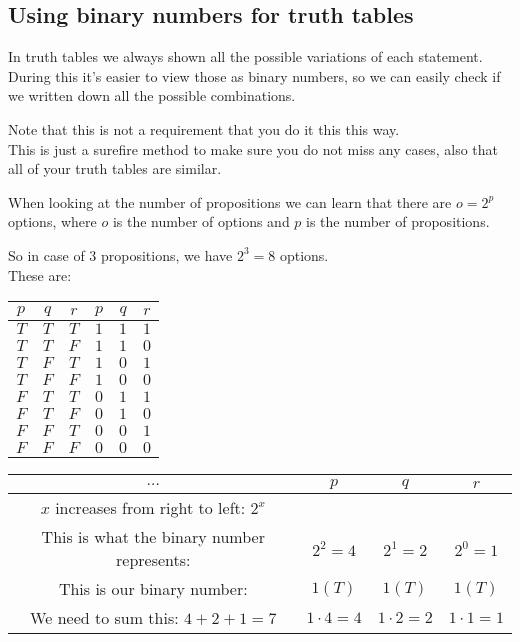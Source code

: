 \documentclass{article}
\begin{document}
\subsection{Using binary numbers for truth tables}
In truth tables we always shown all the possible variations of each statement. During this it's easier to view those as binary numbers, so we can easily check if we written down all the possible combinations.

\begin{center}
  \colorbox{yellow!30}{
    \begin{minipage}{\linewidth-1cm}
      Note that this is not a requirement that you do it this this way.\\
      This is just a surefire method to make sure you do not miss any cases, also that all of your truth tables are similar.
    \end{minipage}
  }
\end{center}
When looking at the number of propositions we can learn that there are $o = 2^{p}$ options, where $o$ is the number of options and $p$ is the number of propositions.

So in case of $3$ propositions, we have $2^{3} = 8$ options.\\
These are:
\begin{center}
  \begin{tabular}{ccc||ccc}
    $p$ & $q$ & $r$ & $p$ & $q$ & $r$ \\ \hline
    $T$ & $T$ & $T$ & $1$ & $1$ & $1$ \\
    $T$ & $T$ & $F$ & $1$ & $1$ & $0$ \\
    $T$ & $F$ & $T$ & $1$ & $0$ & $1$ \\
    $T$ & $F$ & $F$ & $1$ & $0$ & $0$ \\
    $F$ & $T$ & $T$ & $0$ & $1$ & $1$ \\
    $F$ & $T$ & $F$ & $0$ & $1$ & $0$ \\
    $F$ & $F$ & $T$ & $0$ & $0$ & $1$ \\
    $F$ & $F$ & $F$ & $0$ & $0$ & $0$ \\
  \end{tabular}\vspace{.25cm}
  \qquad
  \begin{tabular}{|c|c|c|c|}
    \hline
    $\dots$ & $p$ & $q$ & $r$ \\ \hline
    $x$ increases from right to left: $2^{x}$ & & & \\
    This is what the binary number represents: & $2^2 = 4$ & $2^1 = 2$ & $2^0 = 1$ \\ \hline
    This is our binary number: & $1 \left( T \right)$ & $1 \left( T \right)$ & $1 \left( T \right)$ \\ \hline
    We need to sum this: $4 + 2 + 1 = 7$ & $1 \cdot 4 = 4$ & $1 \cdot 2 = 2$ & $1 \cdot 1 = 1$ \\ \hline
  \end{tabular}
\end{center}
\end{document}
